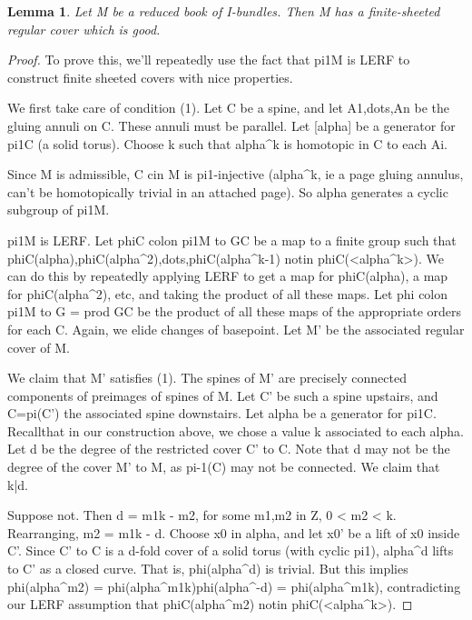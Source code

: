 \documentclass[12pt]{amsart}
\newtheorem{lemma}[theorem]{Lemma}
\theoremstyle{definition}
\theoremstyle{remark}
\begin{document}
\begin{lemma}

Let M be a reduced book of I-bundles. Then M has a finite-sheeted regular cover
which is good.

\end{lemma}

\begin{proof}

To prove this, we'll repeatedly use the fact that pi1M is LERF to construct
finite sheeted covers with nice properties.

We first take care of condition (1). Let C be a spine, and let A1,dots,An be
the gluing annuli on C. These annuli must be parallel. Let [alpha] be
a generator for pi1C (a solid torus). Choose k such that alpha^k is homotopic
in C to each Ai.

Since M is admissible, C cin M is pi1-injective (alpha^k, ie a page gluing
annulus, can't be homotopically trivial in an attached page). So alpha
generates a cyclic subgroup of pi1M.

pi1M is LERF. Let phiC colon pi1M to GC be a map to a finite group such that
phiC(alpha),phiC(alpha^2),dots,phiC(alpha^{k-1}) notin phiC(<alpha^k>). We can
do this by repeatedly applying LERF to get a map for phiC(alpha), a map for
phiC(alpha^2), etc, and taking the product of all these maps. Let phi colon
pi1M to G = prod GC be the product of all these maps of the appropriate orders
for each C.  Again, we elide changes of basepoint.  Let M' be the associated
regular cover of M.

We claim that M' satisfies (1). The spines of M' are precisely connected
components of preimages of spines of M. Let C' be such a spine upstairs, and
C=pi(C') the associated spine downstairs. Let alpha be a generator for pi1C.
Recallthat in our construction above, we chose a value k associated to each
alpha. Let d be the degree of the restricted cover C' to C. Note that d may not
be the degree of the cover M' to M, as pi-1(C) may not be connected. We claim
that k|d.

Suppose not. Then d = m1k - m2, for some m1,m2 in Z, 0 < m2 < k.  Rearranging,
m2 = m1k - d. Choose x0 in alpha, and let x0' be a lift of x0 inside C'. Since
C' to C is a d-fold cover of a solid torus (with cyclic pi1), alpha^d lifts to
C' as a closed curve. That is, phi(alpha^d) is trivial. But this implies
phi(alpha^m2) = phi(alpha^m1k)phi(alpha^-d) = phi(alpha^m1k), contradicting our
LERF assumption that phiC(alpha^m2) notin phiC(<alpha^k>).


\end{proof}
\end{document}
